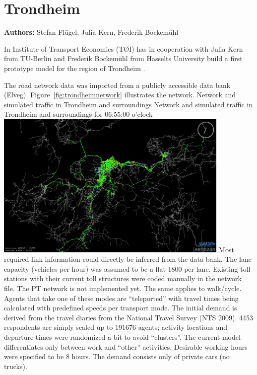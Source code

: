 \section{Trondheim}
\label{ch:scenarios:trondheim}
\hfill \textbf{Authors:} Stefan Flügel, Julia Kern, Frederik Bockemühl


In Institute of Transport Economics (TØI) has in cooperation with Julia Kern from TU-Berlin and Frederik Bockemühl from Hasselts University build a first prototype model for the region of Trondheim \citep[][]{FluegelKern_unpub_WTS_2014}.

The road network data was imported from a publicly accessible data bank (Elveg). Figure~\ref{fig:trondheimnetwork} illustrates the network. 
%
\createfigure%
{Network and simulated traffic in Trondheim and surroundings}%
{Network and simulated traffic in Trondheim and surroundings for 06:55:00 o'clock \citep[source][]{FluegelEtAl_Samferdsel_2014}}%
{\label{fig:trondheimnetwork}}%
{\includegraphics[width=0.85\textwidth, angle=0]{./using/figures/trondheimnetwork.png}}%
{}
%
Most required link information could directly be inferred from the data bank. The lane capacity (vehicles per hour) was assumed to be a flat 1800 per lane. Existing toll stations with their current toll structures were coded manually in the network file. The PT network is not implemented yet. The same applies to walk/cycle. Agents that take one of these modes are ``teleported'' with travel times being calculated with predefined speeds per transport mode. 
The initial demand is derived from the travel diaries from the National Travel Survey (NTS 2009). 4453 respondents are simply scaled up to 191676 agents; activity locations and departure times were randomized a bit to avoid ``clusters''. The current model differentiates only between work and ``other'' activities. Desirable working hours were specified to be 8 hours. The demand consists only of private cars (no trucks). 

